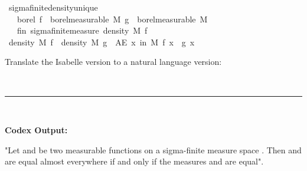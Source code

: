 \documentclass{article}
\begin{document}
\begin{boxB}
\begin{isabelle}
\isamarkupfalse \ sigma{\isacharunderscore}{\kern0pt}finite{\isacharunderscore}{\kern0pt}density{\isacharunderscore}{\kern0pt}unique{\isacharcolon}{\kern0pt}\isanewline
\ \ \ borel{\isacharcolon}{\kern0pt}\ {\isachardoublequoteopen}f\ {\isasymin}\ borel{\isacharunderscore}{\kern0pt}measurable\ M{\isachardoublequoteclose}\ {\isachardoublequoteopen}g\ {\isasymin}\ borel{\isacharunderscore}{\kern0pt}measurable\ M{\isachardoublequoteclose}\isanewline
\ \ \ fin{\isacharcolon}{\kern0pt}\ {\isachardoublequoteopen}sigma{\isacharunderscore}{\kern0pt}finite{\isacharunderscore}{\kern0pt}measure\ {\isacharparenleft}{\kern0pt}density\ M\ f{\isacharparenright}{\kern0pt}{\isachardoublequoteclose}\isanewline
{}\ {\isachardoublequoteopen}density\ M\ f\ {\isacharequal}{\kern0pt}\ density\ M\ g\ {\isasymlongleftrightarrow}\ {\isacharparenleft}{\kern0pt}AE\ x\ in\ M{\isachardot}{\kern0pt}\ f\ x\ {\isacharequal}{\kern0pt}\ g\ x{\isacharparenright}{\kern0pt}{\isachardoublequoteclose}
\end{isabelle}
Translate the Isabelle version to a natural language version:

\
\hrule
\

\textbf{Codex Output:}

"Let  and  be two measurable functions on a sigma-finite measure space . Then  and  are equal almost everywhere if and only if the measures  and  are equal".
\end{boxB}
\end{document}
